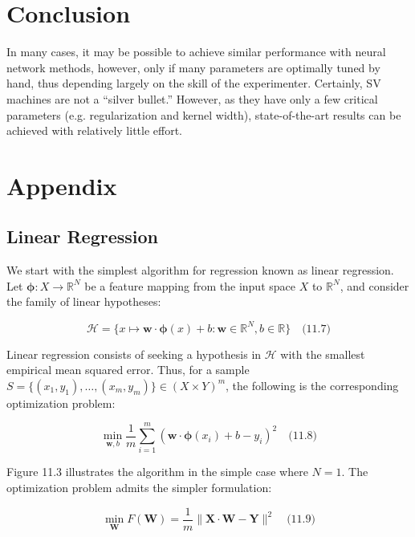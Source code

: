 \documentclass[fleqn,10pt]{olplainarticle}
\begin{document}
\section{Conclusion}

In many cases, it may be possible to achieve similar performance with neural network methods, however, only if many parameters are optimally tuned by hand, thus depending largely on the skill of the experimenter. Certainly, SV machines are not a “silver bullet.” However, as they have only a few critical parameters (e.g. regularization and kernel width), state-of-the-art results can be achieved with relatively little effort.

\section{Appendix}
\subsection{Linear Regression}

We start with the simplest algorithm for regression known as linear regression. Let $\boldsymbol{\phi}: X \to \mathbb{R}^N$ be a feature mapping from the input space $X$ to $\mathbb{R}^N$, and consider the family of linear hypotheses:

\[
\mathcal{H} = \{x \mapsto \mathbf{w} \cdot \boldsymbol{\phi}(x) + b : \mathbf{w} \in \mathbb{R}^N, b \in \mathbb{R}\} \quad \text{(11.7)}
\]

Linear regression consists of seeking a hypothesis in $\mathcal{H}$ with the smallest empirical mean squared error. Thus, for a sample $S = \{(x_1, y_1), \ldots, (x_m, y_m)\} \in (X \times Y)^m$, the following is the corresponding optimization problem:

\[
\min_{\mathbf{w}, b} \frac{1}{m} \sum_{i=1}^{m} (\mathbf{w} \cdot \boldsymbol{\phi}(x_i) + b - y_i)^2 \quad \text{(11.8)}
\]

Figure 11.3 illustrates the algorithm in the simple case where $N = 1$. The optimization problem admits the simpler formulation:

\[
\min_{\mathbf{W}} F(\mathbf{W}) = \frac{1}{m} \|\mathbf{X} \cdot \mathbf{W} - \mathbf{Y}\|^2 \quad \text{(11.9)}
\]
\end{document}

